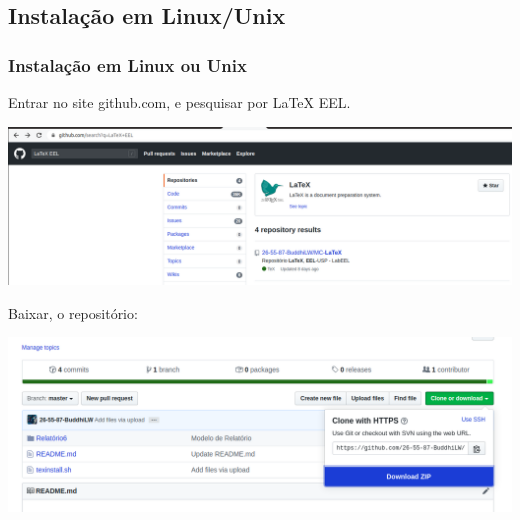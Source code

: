 \documentclass{beamer}
\begin{document}
\begin{frame}
  \section{Instalação em Linux/Unix}
  \frametitle{Instalação em Linux ou Unix}
  Entrar no site github.com, e pesquisar por LaTeX EEL.

  \includegraphics[scale=0.2]{../Imagens/MC1.png}

  \pause

  Baixar, o repositório:

\includegraphics[scale=0.2]{../Imagens/MC3.png}



\end{frame}
\end{document}
